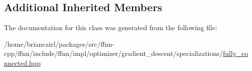 \subsection*{Additional Inherited Members}


The documentation for this class was generated from the following file\-:\begin{DoxyCompactItemize}
\item 
/home/briancairl/packages/src/ffnn-\/cpp/ffnn/include/ffnn/impl/optimizer/gradient\-\_\-descent/specializations/\hyperlink{optimizer_2gradient__descent_2specializations_2fully__connected_8hpp}{fully\-\_\-connected.\-hpp}\end{DoxyCompactItemize}
